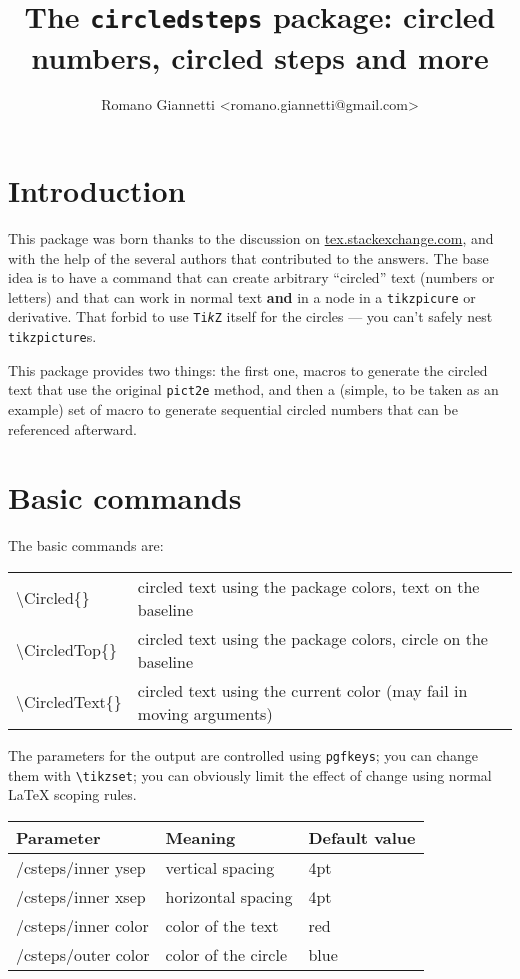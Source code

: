 \documentclass{ltxdoc}
\title{The \texttt{circledsteps} package: circled numbers, circled steps and more}
\author{Romano Giannetti <romano.giannetti@gmail.com>}
\begin{document}
\maketitle

\section{Introduction}

This package was born thanks to the discussion on \href{https://tex.stackexchange.com/questions/7032/good-way-to-make-textcircled-numbers}{tex.stackexchange.com}, and with the help of the several authors that contributed to the answers. The base idea is to have a command that can create arbitrary ``circled'' text (numbers or letters) and that can work in normal text \textbf{and} in a node in a \texttt{tikzpicure} or derivative. That forbid to use \texttt{Ti\emph{k}Z} itself for the circles --- you can't safely nest \texttt{tikzpicture}s.

This package provides two things: the first one, macros to generate the circled text that use the original \texttt{pict2e} method, and then a (simple, to be taken as an example) set of macro to generate sequential circled numbers that can be referenced afterward.

\section{Basic commands}

The basic commands are:

\begin{tabular}{>{\ttfamily\textbackslash}ll}
    \toprule
    Circled\{\} & circled text using the package colors, text on the baseline\\
    CircledTop\{\} & circled text using the package colors, circle on the baseline\\
    CircledText\{\} & circled text using the current color (may fail\footnotemark{} in moving arguments)\\
    \bottomrule
\end{tabular}

The parameters for the output are controlled using \texttt{pgfkeys}; you can change them with \verb|\tikzset|; you can obviously limit the effect of change using normal \LaTeX{} scoping rules.

\begin{tabular}{>{\ttfamily}lll}
    \toprule
    \textbf{Parameter} & \textbf{Meaning} & \textbf{Default value} \\
    \midrule
    /csteps/inner ysep  & vertical spacing & 4pt\\
    /csteps/inner xsep  & horizontal spacing & 4pt\\
    /csteps/inner color & color of the text  & red\\
    /csteps/outer color & color of the circle & blue\\
    \bottomrule
\end{tabular}
\end{document}
